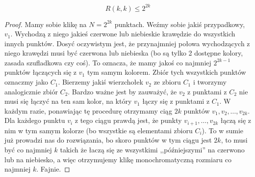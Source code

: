 \begin{theorem}
          \begin{equation}
               R(k,k) \leq 2^{2k}
          \end{equation}
        \end{theorem}

        \begin{proof}
            Mamy sobie klikę na $N = 2^{2k}$ punktach. Weźmy sobie jakiś przypadkowy, $v_1$. Wychodzą z niego jakieś czerwone lub niebieskie krawędzie do wszystkich innych punktów. Dosyć oczywistym jest, że przynajmniej połowa wychodzących z niego krawędzi musi być czerwona lub niebieska (bo są tylko 2 dostępne kolory, zasada szufladkowa czy coś). To oznacza, że mamy jakoś co najmniej $2^{2k-1}$ punktów łączących się z $v_1$ tym samym kolorem. Zbiór tych wszystkich punktów oznaczmy jako $C_1$. Bierzemy jakiś wierzchołek $v_2$ ze zbioru $C_1$ i tworzymy analogicznie zbiór $C_2$. Bardzo ważne jest by zauważyć, że $v_2$ z punktami z $C_2$ nie musi się łączyć na ten sam kolor, na który $v_1$ łączy się z punktami z $C_1$. W każdym razie, ponawiając tę procedurę otrzymamy ciąg $2k$ punktów $v_1, v_2, \dots, v_{2k}$. Dla każdego punktu $v_i$ z tego ciągu prawdą jest, że punkty $v_{i+1}, \dots, v_{2k}$ łączą się z nim w tym samym kolorze (bo wszystkie są elementami zbioru $C_i$). To w sumie już prowadzi nas do rozwiązania, bo skoro punktów w tym ciągu jest $2k$, to musi być co najmniej $k$ takich że łaczą się ze wszystkimi ,,późniejszymi'' na czerwono lub na niebiesko, a więc otrzymujemy klikę monochromatyczną rozmiaru co najmniej $k$. Fajnie. 
        \end{proof}